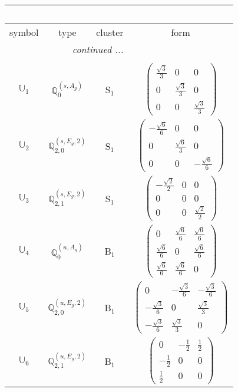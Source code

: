 \documentclass[fleqn,10pt,landscape]{article}
\begin{document}
\begin{itemize}
\begin{center}
\begin{longtable}{c|c|c|c}
\multicolumn{3}{l}{\tablename\ \thetable{}} \\
 \hline \hline
symbol & type & cluster & form \\ \hline \endhead

 \hline \hline
\multicolumn{3}{r}{\footnotesize\it continued ...} \\ \endfoot

 \hline \hline
\multicolumn{3}{r}{} \\ \endlastfoot

$ \mathbb{U}_{1} $ & $\mathbb{Q}_{0}^{(s,A_{g})}$ & S$_{1}$ & $\begin{pmatrix} \frac{\sqrt{3}}{3} & 0 & 0 \\ 0 & \frac{\sqrt{3}}{3} & 0 \\ 0 & 0 & \frac{\sqrt{3}}{3} \end{pmatrix}$ \\
$ \mathbb{U}_{2} $ & $\mathbb{Q}_{2,0}^{(s,E_{g},2)}$ & S$_{1}$ & $\begin{pmatrix} - \frac{\sqrt{6}}{6} & 0 & 0 \\ 0 & \frac{\sqrt{6}}{3} & 0 \\ 0 & 0 & - \frac{\sqrt{6}}{6} \end{pmatrix}$ \\
$ \mathbb{U}_{3} $ & $\mathbb{Q}_{2,1}^{(s,E_{g},2)}$ & S$_{1}$ & $\begin{pmatrix} - \frac{\sqrt{2}}{2} & 0 & 0 \\ 0 & 0 & 0 \\ 0 & 0 & \frac{\sqrt{2}}{2} \end{pmatrix}$ \\ \hline
$ \mathbb{U}_{4} $ & $\mathbb{Q}_{0}^{(u,A_{g})}$ & B$_{1}$ & $\begin{pmatrix} 0 & \frac{\sqrt{6}}{6} & \frac{\sqrt{6}}{6} \\ \frac{\sqrt{6}}{6} & 0 & \frac{\sqrt{6}}{6} \\ \frac{\sqrt{6}}{6} & \frac{\sqrt{6}}{6} & 0 \end{pmatrix}$ \\
$ \mathbb{U}_{5} $ & $\mathbb{Q}_{2,0}^{(u,E_{g},2)}$ & B$_{1}$ & $\begin{pmatrix} 0 & - \frac{\sqrt{3}}{6} & - \frac{\sqrt{3}}{6} \\ - \frac{\sqrt{3}}{6} & 0 & \frac{\sqrt{3}}{3} \\ - \frac{\sqrt{3}}{6} & \frac{\sqrt{3}}{3} & 0 \end{pmatrix}$ \\
$ \mathbb{U}_{6} $ & $\mathbb{Q}_{2,1}^{(u,E_{g},2)}$ & B$_{1}$ & $\begin{pmatrix} 0 & - \frac{1}{2} & \frac{1}{2} \\ - \frac{1}{2} & 0 & 0 \\ \frac{1}{2} & 0 & 0 \end{pmatrix}$ \\

\end{longtable}
\end{center}
\end{itemize}
\end{document}
